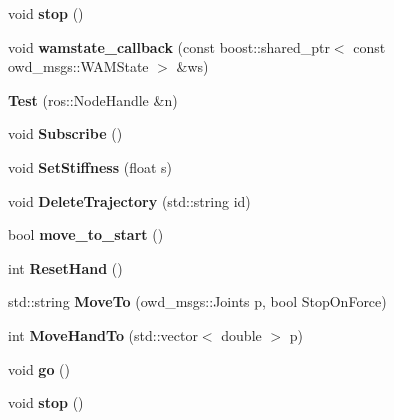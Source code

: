 \begin{DoxyCompactItemize}
\item 
\hypertarget{classTest_a88fd1f486899f36af9ced6caa2d19435}{void {\bfseries stop} ()}\label{classTest_a88fd1f486899f36af9ced6caa2d19435}

\item 
\hypertarget{classTest_a07e7877a5d2eb5a97882dc448e24cc13}{void {\bfseries wamstate\-\_\-callback} (const boost\-::shared\-\_\-ptr$<$ const owd\-\_\-msgs\-::\-W\-A\-M\-State $>$ \&ws)}\label{classTest_a07e7877a5d2eb5a97882dc448e24cc13}

\item 
\hypertarget{classTest_ab1e3525f102f33d7f2e05632b9b3d61e}{{\bfseries Test} (ros\-::\-Node\-Handle \&n)}\label{classTest_ab1e3525f102f33d7f2e05632b9b3d61e}

\item 
\hypertarget{classTest_a7ed02f7fb36d7459785a7822656a23f7}{void {\bfseries Subscribe} ()}\label{classTest_a7ed02f7fb36d7459785a7822656a23f7}

\item 
\hypertarget{classTest_ab1e110d5eda2e9970e0bfb29e3476f74}{void {\bfseries Set\-Stiffness} (float s)}\label{classTest_ab1e110d5eda2e9970e0bfb29e3476f74}

\item 
\hypertarget{classTest_a1432cdac74bb2ce625e152a70ae9cab5}{void {\bfseries Delete\-Trajectory} (std\-::string id)}\label{classTest_a1432cdac74bb2ce625e152a70ae9cab5}

\item 
\hypertarget{classTest_a25c593aefca062bbbd6d39065e9cefc4}{bool {\bfseries move\-\_\-to\-\_\-start} ()}\label{classTest_a25c593aefca062bbbd6d39065e9cefc4}

\item 
\hypertarget{classTest_aec5f669f807310a01d0511b508f981a6}{int {\bfseries Reset\-Hand} ()}\label{classTest_aec5f669f807310a01d0511b508f981a6}

\item 
\hypertarget{classTest_a1c5fd4fa499f8503db6103440b873c32}{std\-::string {\bfseries Move\-To} (owd\-\_\-msgs\-::\-Joints p, bool Stop\-On\-Force)}\label{classTest_a1c5fd4fa499f8503db6103440b873c32}

\item 
\hypertarget{classTest_a579d38c3dc1480196274fb0e37f098f0}{int {\bfseries Move\-Hand\-To} (std\-::vector$<$ double $>$ p)}\label{classTest_a579d38c3dc1480196274fb0e37f098f0}

\item 
\hypertarget{classTest_a96454514cfaf876bf31ed62616c7dcd6}{void {\bfseries go} ()}\label{classTest_a96454514cfaf876bf31ed62616c7dcd6}

\item 
\hypertarget{classTest_a88fd1f486899f36af9ced6caa2d19435}{void {\bfseries stop} ()}\label{classTest_a88fd1f486899f36af9ced6caa2d19435}

\end{DoxyCompactItemize}
